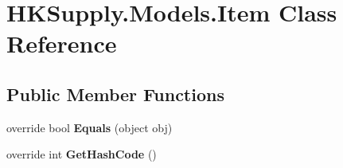 \hypertarget{class_h_k_supply_1_1_models_1_1_item}{}\section{H\+K\+Supply.\+Models.\+Item Class Reference}
\label{class_h_k_supply_1_1_models_1_1_item}
\subsection*{Public Member Functions}
\begin{DoxyCompactItemize}
\item 
\mbox{\label{class_h_k_supply_1_1_models_1_1_item_ab665f20e9ab1750b4bcfecd628e61b32}} 
override bool {\bfseries Equals} (object obj)
\item 
\mbox{\label{class_h_k_supply_1_1_models_1_1_item_a0d1ea4af2c5e510921065932c0e38fda}} 
override int {\bfseries Get\+Hash\+Code} ()
\end{DoxyCompactItemize}

